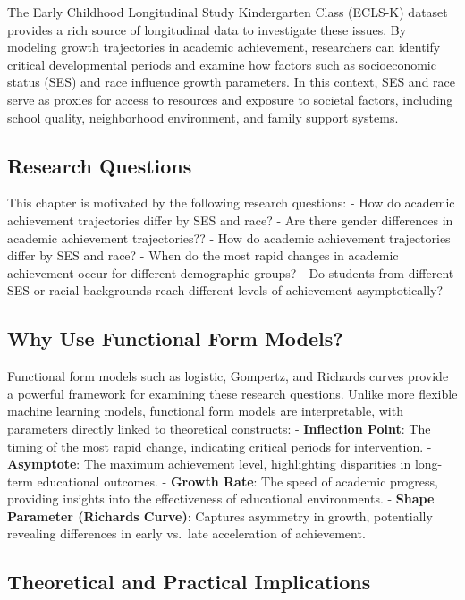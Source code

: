 \documentclass[
  letterpaper,
  DIV=11,
  numbers=noendperiod]{scrreprt}
\begin{document}
The Early Childhood Longitudinal Study Kindergarten Class (ECLS-K)
dataset provides a rich source of longitudinal data to investigate these
issues. By modeling growth trajectories in academic achievement,
researchers can identify critical developmental periods and examine how
factors such as socioeconomic status (SES) and race influence growth
parameters. In this context, SES and race serve as proxies for access to
resources and exposure to societal factors, including school quality,
neighborhood environment, and family support systems.

\subsection{Research Questions}\label{research-questions}

This chapter is motivated by the following research questions: - How do
academic achievement trajectories differ by SES and race? - Are there
gender differences in academic achievement trajectories?? - How do
academic achievement trajectories differ by SES and race? - When do the
most rapid changes in academic achievement occur for different
demographic groups? - Do students from different SES or racial
backgrounds reach different levels of achievement asymptotically?

\subsection{Why Use Functional Form
Models?}\label{why-use-functional-form-models}

Functional form models such as logistic, Gompertz, and Richards curves
provide a powerful framework for examining these research questions.
Unlike more flexible machine learning models, functional form models are
interpretable, with parameters directly linked to theoretical
constructs: - \textbf{Inflection Point}: The timing of the most rapid
change, indicating critical periods for intervention. -
\textbf{Asymptote}: The maximum achievement level, highlighting
disparities in long-term educational outcomes. - \textbf{Growth Rate}:
The speed of academic progress, providing insights into the
effectiveness of educational environments. - \textbf{Shape Parameter
(Richards Curve)}: Captures asymmetry in growth, potentially revealing
differences in early vs.~late acceleration of achievement.

\subsection{Theoretical and Practical
Implications}\label{theoretical-and-practical-implications}
\end{document}
